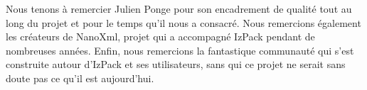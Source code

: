 Nous tenons à remercier Julien Ponge pour son encadrement de qualité tout au long du projet et pour le temps qu'il nous a consacré.
Nous remercions également les créateurs de NanoXml, projet qui a accompagné IzPack pendant de nombreuses années.
Enfin, nous remercions la fantastique communauté qui s'est construite autour d'IzPack et ses utilisateurs, sans qui ce projet ne serait sans doute pas ce qu'il est aujourd'hui.